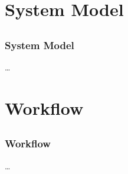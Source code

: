 \section{System Model} \subsection{}
	
	\begin{frame}[fragile=singleslide]
	\frametitle{System Model}
	 
	\ldots
	
  \end{frame}	
		
	

	\section{Workflow} \subsection{}
	
		\begin{frame}[fragile=singleslide]
		\frametitle{Workflow}
		
			\ldots
		
		\end{frame}

